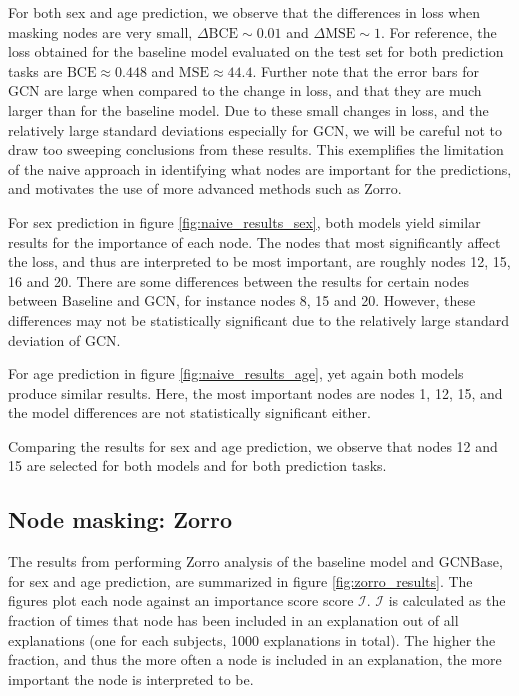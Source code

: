 For both sex and age prediction, we observe that the differences in loss when masking nodes are very small, $\Delta\text{BCE} \sim 0.01$ and $\Delta\text{MSE} \sim 1$. For reference, the loss obtained for the baseline model evaluated on the test set for both prediction tasks are $\text{BCE} \approx 0.448$ and $\text{MSE} \approx 44.4$. Further note that the error bars for GCN are large when compared to the change in loss, and that they are much larger than for the baseline model. Due to these small changes in loss, and the relatively large standard deviations especially for GCN, we will be careful not to draw too sweeping conclusions from these results. This exemplifies the limitation of the naive approach in identifying what nodes are important for the predictions, and motivates the use of more advanced methods such as Zorro.

For sex prediction in figure \ref{fig:naive_results_sex}, both models yield similar results for the importance of each node. The nodes that most significantly affect the loss, and thus are interpreted to be most important, are roughly nodes 12, 15, 16 and 20. There are some differences between the results for certain nodes between Baseline and GCN, for instance nodes 8, 15 and 20. However, these differences may not be statistically significant due to the relatively large standard deviation of GCN.

For age prediction in figure \ref{fig:naive_results_age}, yet again both models produce similar results. Here, the most important nodes are nodes 1, 12, 15, and the model differences are not statistically significant either.

Comparing the results for sex and age prediction, we observe that nodes 12 and 15 are selected for both models and for both prediction tasks. 
 
\subsection{Node masking: Zorro}

The results from performing Zorro analysis of the baseline model and GCNBase, for sex and age prediction, are summarized in figure \ref{fig:zorro_results}. The figures plot each node against an importance score score $\mathcal{I}$. $\mathcal{I}$ is calculated as the fraction of times that node has been included in an explanation out of all explanations (one for each subjects, 1000 explanations in total). The higher the fraction, and thus the more often a node is included in an explanation, the more important the node is interpreted to be.

